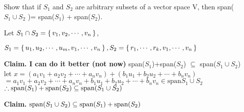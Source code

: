 Show that if $S_1$ and $S_2$ are arbitrary subsets of a vector space $\mathrm{V}$, then span($S_1 \cup S_2$ )= span($S_1$) + span($S_2$).

\begin{tcolorbox}
	\begin{solution}
	
		Let $S_1 \cap S_2 = \left\{ \,v_1,v_2,\cdots , v_n \,\right\}$,
		
		$S_1 = \left\{ \,u_1,u_2,\cdots,u_m,v_1,\cdots,v_n \,\right\} , S_2 = \left\{ \,r_1,\cdots,r_k,v_{1}, \cdots,v_{n} \,\right\}$  
		
		\textbf{Claim. I can do it better (not now)} span($S_1$)+span($S_2$) $\subseteq$ span($S_1 \cup S_2$)\\
		let $x = (a_1v_1 + a_2v_2 + \cdots + a_nv_n)+(b_1u_1+b_2u_2+\cdots+b_nv_n)$\\
		$=a_1v_1 + a_2v_2 + \cdots + a_nv_n+b_1u_1+b_2u_2+\cdots+b_nv_n \in \text{span$S_1 \cup S_2$}$\\
		$\therefore \text{span($S_1$)} + \text{span($S_2$)} \subseteq \text{span($S_1 \cup S_2$)} $
		
		\textbf{Claim.} $\text{span($S_1 \cup S_2$)} \subseteq \text{span($S_1$)} + \text{span($S_2$)}$\\
		
	\end{solution}
\end{tcolorbox}